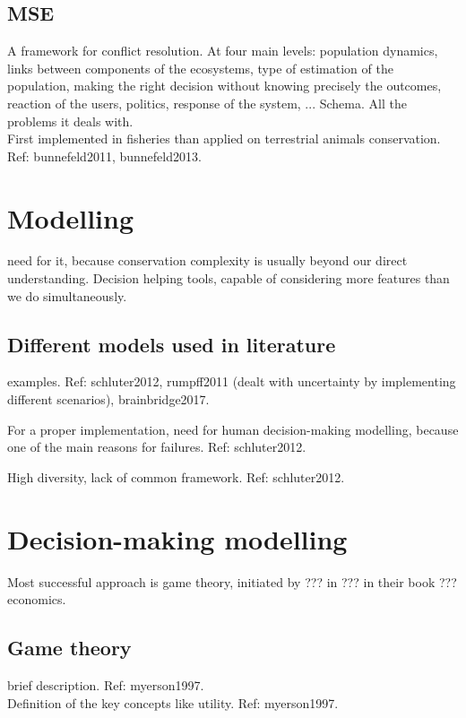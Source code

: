 \documentclass[12pt,a4paper]{article}
\begin{document}
\subsection{MSE}

A framework for conflict resolution.
At four main levels: population dynamics, links between components of the ecosystems, type of estimation of the population, making the right decision without knowing precisely the outcomes, reaction of the users, politics, response of the system, ...
Schema.
All the problems it deals with. \\
First implemented in fisheries than applied on terrestrial animals conservation. Ref: bunnefeld2011, bunnefeld2013.\\

\section{Modelling}

need for it, because conservation complexity is usually beyond our direct understanding. Decision helping tools, capable of considering more features than we do simultaneously.

\subsection{Different models used in literature}

examples. Ref: schluter2012, rumpff2011 (dealt with uncertainty by implementing different scenarios), brainbridge2017.

For a proper implementation, need for human decision-making modelling, because one of the main reasons for failures. Ref: schluter2012.

High diversity, lack of common framework. Ref: schluter2012.\\

\section{Decision-making modelling}

Most successful approach is game theory, initiated by ??? in ??? in their book ??? economics.

\subsection{Game theory}
brief description. Ref: myerson1997.\\
Definition of the key concepts like utility. Ref: myerson1997.
\end{document}
